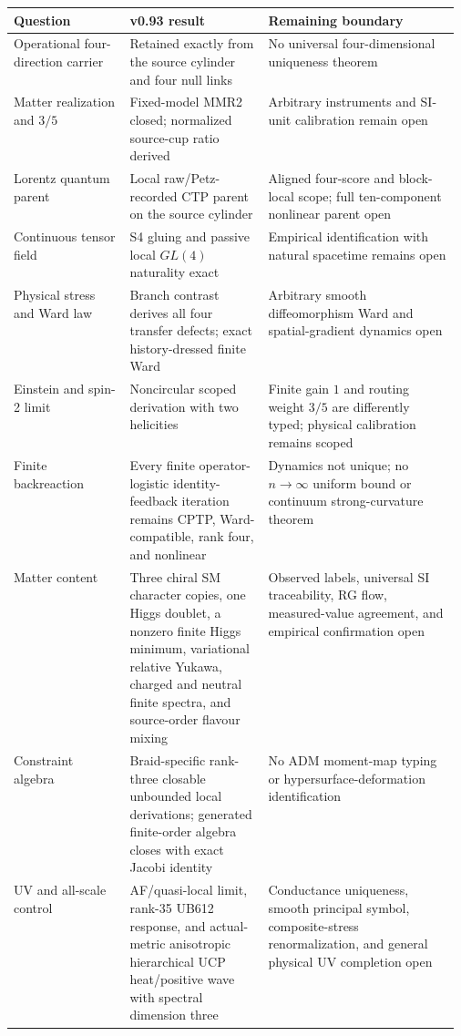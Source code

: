 \documentclass[11pt]{article}
\theoremstyle{definition}
\theoremstyle{remark}
\begin{document}
\begin{table}[ht]
\centering
\scriptsize
\begin{tabularx}{\linewidth}{>{\raggedright\arraybackslash}p{0.26\linewidth} >{\raggedright\arraybackslash}p{0.31\linewidth} X}
\toprule
Question & v0.93 result & Remaining boundary \\
\midrule
Operational four-direction carrier & Retained exactly from the source cylinder and four null links & No universal four-dimensional uniqueness theorem \\
Matter realization and $3/5$ & Fixed-model MMR2 closed; normalized source-cup ratio derived & Arbitrary instruments and SI-unit calibration remain open \\
Lorentz quantum parent & Local raw/Petz-recorded CTP parent on the source cylinder & Aligned four-score and block-local scope; full ten-component nonlinear parent open \\
Continuous tensor field & S4 gluing and passive local $GL(4)$ naturality exact & Empirical identification with natural spacetime remains open \\
Physical stress and Ward law & Branch contrast derives all four transfer defects; exact history-dressed finite Ward & Arbitrary smooth diffeomorphism Ward and spatial-gradient dynamics open \\
Einstein and spin-2 limit & Noncircular scoped derivation with two helicities & Finite gain $1$ and routing weight $3/5$ are differently typed; physical calibration remains scoped \\
Finite backreaction & Every finite operator-logistic identity-feedback iteration remains CPTP, Ward-compatible, rank four, and nonlinear & Dynamics not unique; no $n\to\infty$ uniform bound or continuum strong-curvature theorem \\
Matter content & Three chiral SM character copies, one Higgs doublet, a nonzero finite Higgs minimum, variational relative Yukawa, charged and neutral finite spectra, and source-order flavour mixing & Observed labels, universal SI traceability, RG flow, measured-value agreement, and empirical confirmation open \\
Constraint algebra & Braid-specific rank-three closable unbounded local derivations; generated finite-order algebra closes with exact Jacobi identity & No ADM moment-map typing or hypersurface-deformation identification \\
UV and all-scale control & AF/quasi-local limit, rank-35 UB612 response, and actual-metric anisotropic hierarchical UCP heat/positive wave with spectral dimension three & Conductance uniqueness, smooth principal symbol, composite-stress renormalization, and general physical UV completion open \\

\end{tabularx}
\end{table}
\end{document}
